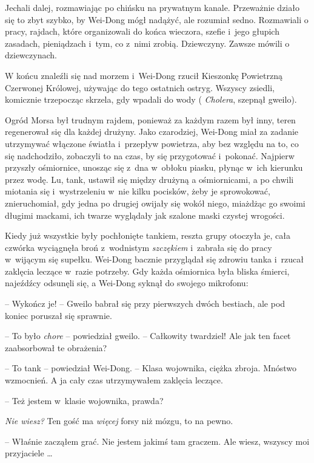 \documentclass[oneside,polish,11pt,rmheadings]{mwbk}
\begin{document}
Jechali dalej, rozmawiając po chińsku na prywatnym kanale. Przeważnie działo się to zbyt szybko, by Wei-Dong mógł nadążyć, ale rozumiał sedno. Rozmawiali o pracy, rajdach, które organizowali do końca wieczora, szefie i~jego głupich zasadach, pieniądzach i~tym, co z~nimi zrobią. Dziewczyny. Zawsze mówili o dziewczynach. 


W końcu znaleźli się nad morzem i~Wei-Dong rzucił Kieszonkę Powietrzną Czerwonej Królowej, używając do tego ostatnich ostryg. Wszyscy zsiedli, komicznie trzepocząc skrzela, gdy wpadali do wody ( \textit{Cholera}, szepnął gweilo). 


Ogród Morsa był trudnym rajdem, ponieważ za każdym razem był inny, teren regenerował się dla każdej drużyny. Jako czarodziej, Wei-Dong miał za zadanie utrzymywać włączone światła i~przepływ powietrza, aby bez względu na to, co się nadchodziło, zobaczyli to na czas, by się przygotować i~pokonać. Najpierw przyszły ośmiornice, unosząc się z~dna w~obłoku piasku, płynąc w~ich kierunku przez wodę. Lu, tank, ustawił się między drużyną a ośmiornicami, a po chwili miotania się i~wystrzeleniu w~nie kilku pocisków, żeby je sprowokować, znieruchomiał, gdy jedna po drugiej owijały się wokół niego, miażdżąc go swoimi długimi mackami, ich twarze wyglądały jak szalone maski czystej wrogości. 


Kiedy już wszystkie były pochłonięte tankiem, reszta grupy otoczyła je, cała czwórka wyciągnęła broń z~wodnistym \textit{szczękiem} i~zabrała się do pracy w~wijącym się supełku. Wei-Dong bacznie przyglądał się zdrowiu tanka i~rzucał zaklęcia leczące w~razie potrzeby. Gdy każda ośmiornica była bliska śmierci, najeźdźcy odsunęli się, a Wei-Dong syknął do swojego mikrofonu: 

-- Wykończ je! -- Gweilo babrał się przy pierwszych dwóch bestiach, ale pod koniec poruszał się sprawnie. 


-- To było \textit{chore }-- powiedział gweilo. -- Całkowity twardziel! Ale jak ten facet zaabsorbował te obrażenia? 


-- To tank -- powiedział Wei-Dong. -- Klasa wojownika, ciężka zbroja. Mnóstwo wzmocnień. A ja cały czas utrzymywałem zaklęcia leczące. 


-- Też jestem w~klasie wojownika, prawda? 


\textit{Nie wiesz? }Ten gość ma \textit{więcej} forsy niż mózgu, to na pewno. 


-- Właśnie zacząłem grać. Nie jestem jakimś tam graczem. Ale wiesz, wszyscy moi przyjaciele \ldots  
\end{document}
